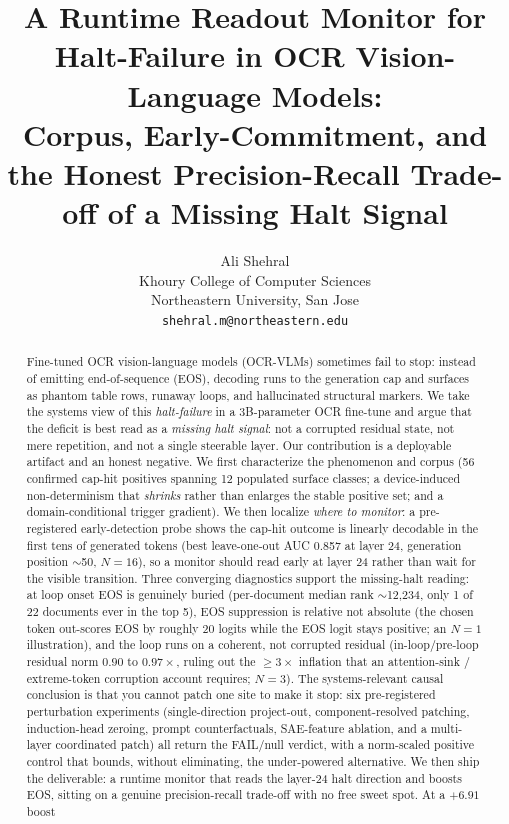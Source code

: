 \documentclass[11pt]{article}
\title{\textbf{A Runtime Readout Monitor for Halt-Failure in OCR Vision-Language Models:\\
Corpus, Early-Commitment, and the Honest Precision-Recall Trade-off of a Missing Halt Signal}}
\author{
  Ali Shehral\\
  Khoury College of Computer Sciences\\
  Northeastern University, San Jose\\
  \texttt{shehral.m@northeastern.edu}
}
\date{}
\begin{document}
\maketitle

\begin{abstract}
Fine-tuned OCR vision-language models (OCR-VLMs) sometimes fail to stop: instead of
emitting end-of-sequence (EOS), decoding runs to the generation cap and surfaces as
phantom table rows, runaway loops, and hallucinated structural markers. We take the
systems view of this \emph{halt-failure} in a 3B-parameter OCR fine-tune and argue that
the deficit is best read as a \emph{missing halt signal}: not a corrupted residual state,
not mere repetition, and not a single steerable layer. Our contribution is a deployable
artifact and an honest negative. We first characterize the phenomenon and corpus (56
confirmed cap-hit positives spanning 12 populated surface classes; a device-induced
non-determinism that \emph{shrinks} rather than enlarges the stable positive set; and a
domain-conditional trigger gradient). We then localize \emph{where to monitor}: a
pre-registered early-detection probe shows the cap-hit outcome is linearly decodable in
the first tens of generated tokens (best leave-one-out AUC 0.857 at layer 24, generation
position $\sim$50, $N=16$), so a monitor should read early at layer 24 rather than wait
for the visible transition. Three converging diagnostics support the missing-halt reading:
at loop onset EOS is genuinely buried (per-document median rank $\sim$12{,}234, only 1 of
22 documents ever in the top 5), EOS suppression is relative not absolute (the chosen
token out-scores EOS by roughly 20 logits while the EOS logit stays positive; an $N=1$
illustration), and the loop runs on a coherent, not corrupted residual (in-loop/pre-loop
residual norm $0.90$ to $0.97\times$, ruling out the $\geq 3\times$ inflation that an
attention-sink / extreme-token corruption account requires; $N=3$). The systems-relevant
causal conclusion is that you cannot patch one site to make it stop: six pre-registered
perturbation experiments (single-direction project-out, component-resolved patching,
induction-head zeroing, prompt counterfactuals, SAE-feature ablation, and a multi-layer
coordinated patch) all return the FAIL/null verdict, with a norm-scaled positive control
that bounds, without eliminating, the under-powered alternative. We then ship the
deliverable: a runtime monitor that reads the layer-24 halt direction and boosts EOS,
sitting on a genuine precision-recall trade-off with no free sweet spot. At a $+6.91$ boost

\end{abstract}
\end{document}
